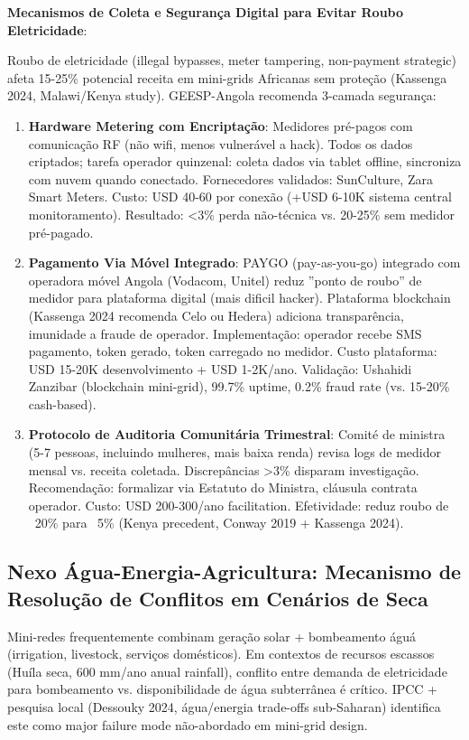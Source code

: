 \documentclass[12pt, a4paper]{article}
\begin{document}
\textbf{Mecanismos de Coleta e Segurança Digital para Evitar Roubo Eletricidade}:

Roubo de eletricidade (illegal bypasses, meter tampering, non-payment strategic) afeta 15-25\% potencial receita em mini-grids Africanas sem proteção (Kassenga 2024, Malawi/Kenya study). GEESP-Angola recomenda 3-camada segurança:

\begin{enumerate}
\item \textbf{Hardware Metering com Encriptação}: Medidores pré-pagos com comunicação RF (não wifi, menos vulnerável a hack). Todos os dados criptados; tarefa operador quinzenal: coleta dados via tablet offline, sincroniza com nuvem quando conectado. Fornecedores validados: SunCulture, Zara Smart Meters. Custo: USD 40-60 por conexão (+USD 6-10K sistema central monitoramento). Resultado: <3\% perda não-técnica vs. 20-25\% sem medidor pré-pagado.

\item \textbf{Pagamento Via Móvel Integrado}: PAYGO (pay-as-you-go) integrado com operadora móvel Angola (Vodacom, Unitel) reduz ''ponto de roubo'' de medidor para plataforma digital (mais dificil hacker). Plataforma blockchain (Kassenga 2024 recomenda Celo ou Hedera) adiciona transparência, imunidade a fraude de operador. Implementação: operador recebe SMS pagamento, token gerado, token carregado no medidor. Custo plataforma: USD 15-20K desenvolvimento + USD 1-2K/ano. Validação: Ushahidi Zanzibar (blockchain mini-grid), 99.7\% uptime, 0.2\% fraud rate (vs. 15-20\% cash-based).

\item \textbf{Protocolo de Auditoria Comunitária Trimestral}: Comité de ministra (5-7 pessoas, incluindo mulheres, mais baixa renda) revisa logs de medidor mensal vs. receita coletada. Discrepâncias >3\% disparam investigação. Recomendação: formalizar via Estatuto do Ministra, cláusula contrata operador. Custo: USD 200-300/ano facilitation. Efetividade: reduz roubo de ~20\% para ~5\% (Kenya precedent, Conway 2019 + Kassenga 2024).

\end{enumerate}

\subsection{Nexo Água-Energia-Agricultura: Mecanismo de Resolução de Conflitos em Cenários de Seca}

Mini-redes frequentemente combinam geração solar + bombeamento águá (irrigation, livestock, serviços domésticos). Em contextos de recursos escassos (Huíla seca, 600 mm/ano anual rainfall), conflito entre demanda de eletricidade para bombeamento vs. disponibilidade de água subterrânea é crítico. IPCC + pesquisa local (Dessouky 2024, água/energia trade-offs sub-Saharan) identifica este como major failure mode não-abordado em mini-grid design.
\end{document}
